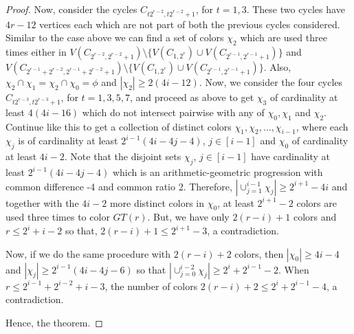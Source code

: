 \documentclass[10pt,a4paper]{amsart}
\begin{document}
\begin{proof}
Now, consider the cycles 
$C_{t2^{r-2},t2^{r-2}+1}$, for $t=1,3$. These two cycles have $4r-12$ vertices each which are not part of both the previous cycles considered. Similar to the case above we can find a set of colors $\chi_2$ which are used three times either in $V(C_{2^{r-2},2^{r-2}+1}) \setminus \{ V (C_{1,2^r})\cup V( C_{2^{r-1},2^{r-1}+1})\}$ and $V(C_{2^{r-1}+2^{r-2},2^{r-1}+2^{r-2}+1}) \setminus \{V(C_{1,2^r}) \cup V(C_{2^{r-1},2^{r-1}+1})\}$. Also, $ \chi_2 \cap \chi_1 = \chi_2 \cap \chi_0 = \phi$ and $|\chi_2| \geq 2(4i - 12)$. Now, we consider the four cycles 
$C_{t2^{r-3},t2^{r-3}+1}$, for $t=1,3,5,7$, and proceed as above to get $\chi_3$ of cardinality at least $4(4i - 16)$ which do not intersect pairwise with any of $\chi_0,\chi_1$ and $\chi_2$. Continue like this to get a collection of distinct colors $\chi_1, \chi_2,\ldots,\chi_{i-1}$, where each $\chi_j$ is of cardinality at least $2^{i-1}(4i - 4j - 4)$, $j \in [i-1]$ and $\chi_0$ of cardinality at least $4i-2$. Note that the disjoint sets $\chi_j$, $j \in [i-1]$ have cardinality at least $2^{i-1}(4i - 4j - 4)$ which is an arithmetic-geometric progression with common difference -4 and common ratio 2. Therefore, $|\cup_{j=1}^{i-1}\chi_j |\geq 2^{i+1}-4i$ and together with the $4i-2$ more distinct colors in $\chi_0$, at least $2^{i+1}-2$ colors are used three times to color $GT(r)$. But, we have only $2(r-i)+1$ colors and $r\leq 2^i+i-2$ so that, $2(r-i)+1 \leq 2^{i+1}-3$, a contradiction. 


Now, if we do the same procedure with $2(r-i)+2$ colors, then $|\chi_0| \geq 4i - 4$ and $|\chi_j| \geq 2^{i-1}(4i - 4j - 6)$ so that $|\cup_{j=0}^{i-2}\chi_j| \geq 2^{i}+2^{i-1}-2$. When $r \leq 2^{i-1}+2^{i-2} + i - 3$, the number of colors $2(r-i)+2 \leq 2^{i}+2^{i-1}-4$, a contradiction. \par

Hence, the theorem.
\end{proof}
\end{document}
